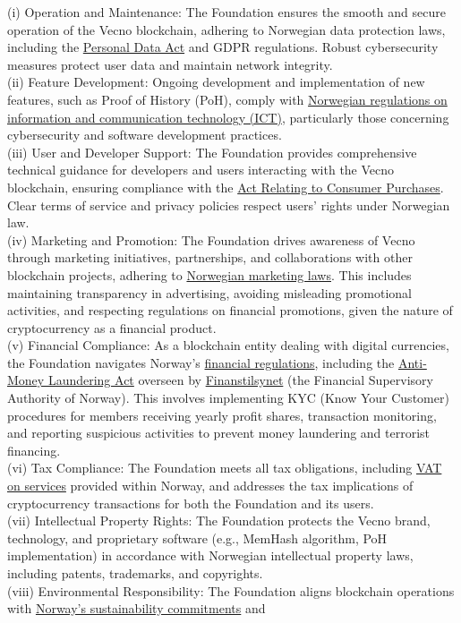 \documentclass[a4paper,onecolumn,superscriptaddress,10pt]{compositionalityarticle}
\begin{document}
(i) Operation and Maintenance: The Foundation ensures the smooth and secure operation of the Vecno blockchain, adhering to Norwegian data protection laws, including the \href{https://lovdata.no/dokument/NLE/lov/2018-06-15-38}{Personal Data Act} and GDPR regulations. Robust cybersecurity measures protect user data and maintain network integrity.\\ (ii) Feature Development: Ongoing development and implementation of new features, such as Proof of History (PoH), comply with \href{https://lovdata.no/dokument/SFE/forskrift/2003-05-21-630}{Norwegian regulations on information and communication technology (ICT)}, particularly those concerning cybersecurity and software development practices.\\ (iii) User and Developer Support: The Foundation provides comprehensive technical guidance for developers and users interacting with the Vecno blockchain, ensuring compliance with the \href{https://lovdata.no/dokument/NLE/lov/2002-06-21-34/}{Act Relating to Consumer Purchases}. Clear terms of service and privacy policies respect users’ rights under Norwegian law.\\ (iv) Marketing and Promotion: The Foundation drives awareness of Vecno through marketing initiatives, partnerships, and collaborations with other blockchain projects, adhering to \href{https://lovdata.no/dokument/NLE/lov/2009-01-09-2}{Norwegian marketing laws}. This includes maintaining transparency in advertising, avoiding misleading promotional activities, and respecting regulations on financial promotions, given the nature of cryptocurrency as a financial product.\\ (v) Financial Compliance: As a blockchain entity dealing with digital currencies, the Foundation navigates Norway’s \href{https://www.finanstilsynet.no/en/laws-and-regulations/}{financial regulations}, including the \href{https://lovdata.no/dokument/NLE/lov/2018-06-01-23}{Anti-Money Laundering Act} overseen by \href{https://www.finanstilsynet.no/en/}{Finanstilsynet} (the Financial Supervisory Authority of Norway). This involves implementing KYC (Know Your Customer) procedures for members receiving yearly profit shares, transaction monitoring, and reporting suspicious activities to prevent money laundering and terrorist financing.\\ (vi) Tax Compliance: The Foundation meets all tax obligations, including \href{https://www.skatteetaten.no/en/business-and-organisation/vat-and-duties/vat/foreign/}{VAT on services} provided within Norway, and addresses the tax implications of cryptocurrency transactions for both the Foundation and its users.\\ (vii) Intellectual Property Rights: The Foundation protects the Vecno brand, technology, and proprietary software (e.g., MemHash algorithm, PoH implementation) in accordance with Norwegian intellectual property laws, including patents, trademarks, and copyrights.\\ (viii) Environmental Responsibility: The Foundation aligns blockchain operations with \href{https://www.regjeringen.no/globalassets/departementene/ud/vedlegg/utvikling/sdg_rapport_full_en.pdf}{Norway’s sustainability commitments} and 
\end{document}
